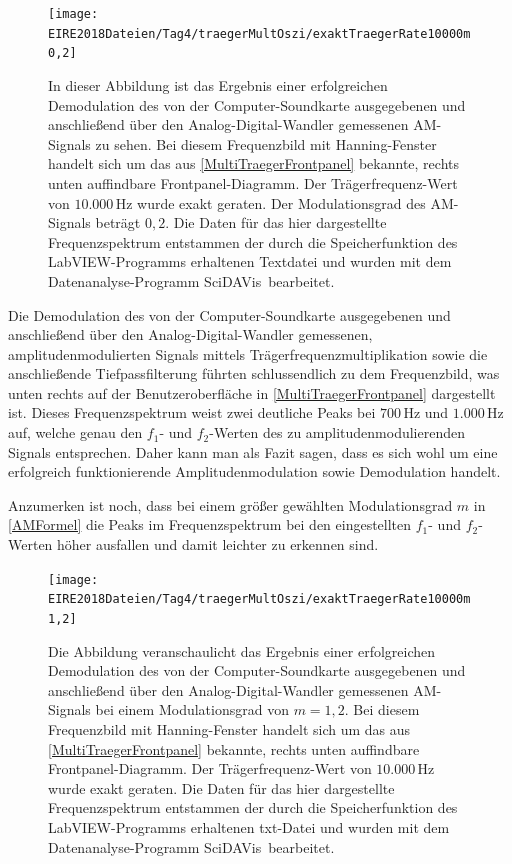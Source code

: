 \documentclass[
a4paper,
12pt,
pagesize,
ngerman
]{scrartcl}
\begin{document}
	\begin{figure}[H]
		\centering
		\texttt{[image: EIRE2018Dateien/Tag4/traegerMultOszi/exaktTraegerRate10000m0,2]}
		\caption{In dieser Abbildung ist das Ergebnis einer erfolgreichen Demodulation des von der Computer-Soundkarte ausgegebenen und anschließend über den Analog-Digital-Wandler gemessenen AM-Signals zu sehen. Bei diesem Frequenzbild mit Hanning-Fenster handelt sich um das aus \cref{MultiTraegerFrontpanel} bekannte, rechts unten auffindbare Frontpanel-Diagramm. Der Trägerfrequenz-Wert von $10.000\,$Hz wurde exakt geraten. Der Modulationsgrad des AM-Signals beträgt $0,2$. Die Daten für das hier dargestellte Frequenzspektrum entstammen der durch die Speicherfunktion des LabVIEW-Programms erhaltenen Textdatei und wurden mit dem Datenanalyse-Programm \glqq SciDAVis\grqq\ bearbeitet.} %
		\label{AMDemodsuccm02}
	\end{figure}

	\noindent Die Demodulation des von der Computer-Soundkarte ausgegebenen und anschließend über den Analog-Digital-Wandler gemessenen, amplitudenmodulierten Signals mittels Trägerfrequenzmultiplikation sowie die anschließende Tiefpassfilterung führten schlussendlich zu dem Frequenzbild, was unten rechts auf der Benutzeroberfläche in \cref{MultiTraegerFrontpanel} dargestellt ist.
	Dieses Frequenzspektrum weist zwei deutliche Peaks bei $700\,$Hz und $1.000\,$Hz auf, welche genau den $f_1$- und $f_2$-Werten des zu amplitudenmodulierenden Signals entsprechen. 
	Daher kann man als Fazit sagen, dass es sich wohl um eine erfolgreich funktionierende Amplitudenmodulation sowie Demodulation handelt. 
	
	Anzumerken ist noch, dass bei einem größer gewählten Modulationsgrad $m$ in \cref{AMFormel} die Peaks im Frequenzspektrum bei den eingestellten $f_1$- und $f_2$-Werten höher ausfallen und damit leichter zu erkennen sind. 
	
	\begin{figure}[H]
		\centering
		\texttt{[image: EIRE2018Dateien/Tag4/traegerMultOszi/exaktTraegerRate10000m1,2]}
		\caption{Die Abbildung veranschaulicht das Ergebnis einer erfolgreichen Demodulation des von der Computer-Soundkarte ausgegebenen und anschließend über den Analog-Digital-Wandler gemessenen AM-Signals bei einem Modulationsgrad von $m = 1,2$. Bei diesem Frequenzbild mit Hanning-Fenster handelt sich um das aus \cref{MultiTraegerFrontpanel} bekannte, rechts unten auffindbare Frontpanel-Diagramm. Der Trägerfrequenz-Wert von $10.000\,$Hz wurde exakt geraten. Die Daten für das hier dargestellte Frequenzspektrum entstammen der durch die Speicherfunktion des LabVIEW-Programms erhaltenen txt-Datei und wurden mit dem Datenanalyse-Programm \glqq SciDAVis\grqq\ bearbeitet.}
		\label{AMDemodsuccm12}
	\end{figure}
\end{document}
